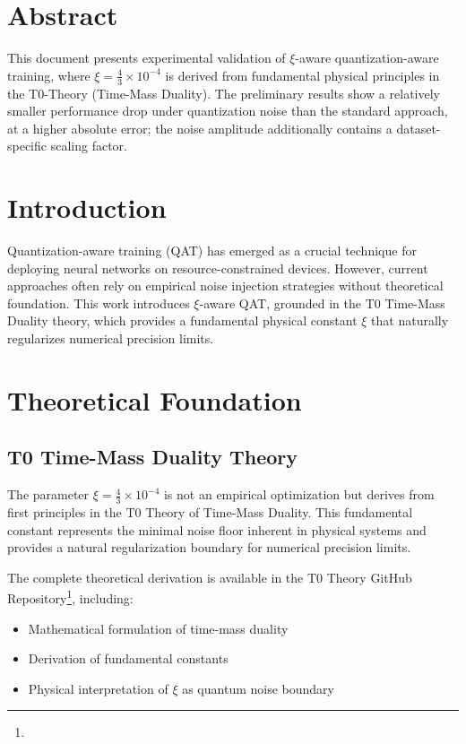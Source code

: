 \section*{Abstract}
		This document presents experimental validation of $\xi$-aware quantization-aware training, where $\xi = \frac{4}{3} \times 10^{-4}$ is derived from fundamental physical principles in the T0-Theory (Time-Mass Duality). The preliminary results show a relatively smaller performance drop under quantization noise than the standard approach, at a higher absolute error; the noise amplitude additionally contains a dataset-specific scaling factor.

	
	
	\section{Introduction}
	
	Quantization-aware training (QAT) has emerged as a crucial technique for deploying neural networks on resource-constrained devices. However, current approaches often rely on empirical noise injection strategies without theoretical foundation. This work introduces $\xi$-aware QAT, grounded in the T0 Time-Mass Duality theory, which provides a fundamental physical constant $\xi$ that naturally regularizes numerical precision limits.
	
	\section{Theoretical Foundation}
	
	\subsection{T0 Time-Mass Duality Theory}
	
	The parameter $\xi = \frac{4}{3} \times 10^{-4}$ is not an empirical optimization but derives from first principles in the T0 Theory of Time-Mass Duality. This fundamental constant represents the minimal noise floor inherent in physical systems and provides a natural regularization boundary for numerical precision limits.
	
	The complete theoretical derivation is available in the T0 Theory GitHub Repository\footnote{}, including:
	\begin{itemize}
		\item Mathematical formulation of time-mass duality
		\item Derivation of fundamental constants
		\item Physical interpretation of $\xi$ as quantum noise boundary
	\end{itemize}
	
